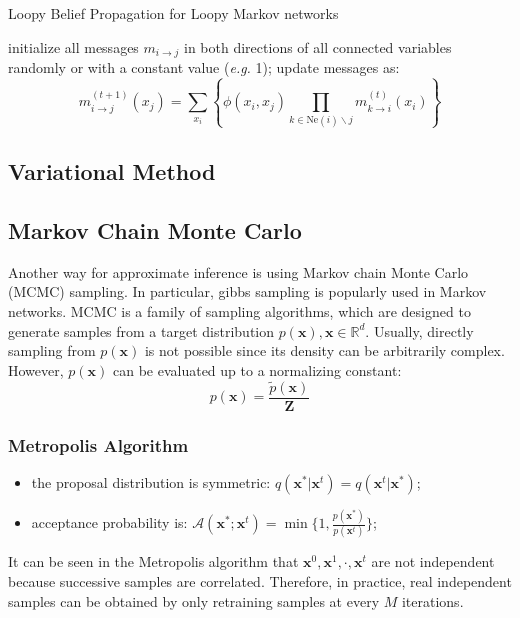 


\begin{algorithm}
	\caption{Loopy Belief Propagation for Loopy Markov networks}
	\label{alg:LBP}
\begin{algorithmic}[1]
\STATE  initialize all messages $m_{i\rightarrow j}$ in both directions of all connected variables randomly or with a constant value (\emph{e.g.} 1);
\STATE  update messages as:
\begin{equation*}
  m^{(t+1)}_{i \rightarrow j}(x_j)= \sum_{x_i}\left\{\phi(x_i,x_j) \prod_{k\in \text{Ne}(i)\backslash j} m^{(t)}_{k \rightarrow i}(x_i)\right\}
\end{equation*}
\ENDWHILE
\end{algorithmic}
\end{algorithm}


\subsection{Variational Method}


\subsection{Markov Chain Monte Carlo}
Another way for approximate inference is using Markov chain Monte Carlo (MCMC) sampling. In particular, gibbs sampling is popularly used in Markov networks.    
MCMC is a family of sampling algorithms, which are designed to generate samples from a target distribution $p(\mathbf{x}), \mathbf{x}\in\mathbb{R}^d$. 
Usually, directly sampling from $p(\mathbf{x})$ is not possible since its density can be arbitrarily complex. However, $p(\mathbf{x})$ can be evaluated up to a normalizing constant:
\begin{equation*}
	p(\mathbf{x})=\frac{\tilde{p}(\mathbf{x})}{\mathbf{Z}}
\end{equation*}

\subsubsection{Metropolis Algorithm}
\begin{itemize}
	\item the proposal distribution is symmetric: $q(\mathbf{x}^*|\mathbf{x}^t)=q(\mathbf{x}^t|\mathbf{x}^*)$;
	\item acceptance probability is: $\mathcal{A}(\mathbf{x}^*;\mathbf{x}^t) = \min\{1, \frac{p(\mathbf{x}^*)}{p(\mathbf{x}^t)}\}$; 
\end{itemize}
It can be seen in the Metropolis algorithm that  $\mathbf{x}^0,\mathbf{x}^1,\cdot, \mathbf{x}^t$ are not independent because successive samples are correlated. Therefore, in practice, real independent 
samples can be obtained by only retraining samples at every $M$ iterations. 

